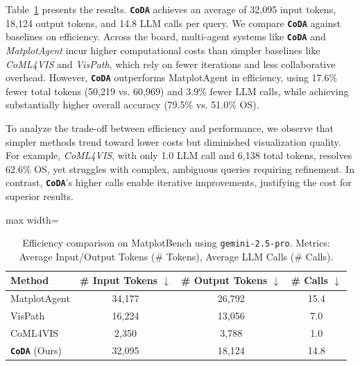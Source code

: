 \documentclass[11pt, a4paper, logo, copyright]{googlecloud}
\newcommand{\methodname}{\textbf{\texttt{\textcolor{StarIndigo}{C}\textcolor{StarIndigo}{o}\textcolor{StarCoral}{D}\textcolor{StarTeal}{A}}}}
\newcommand{\io}[1]{\setlength{\fboxsep}{1pt}\colorbox{gray!10}{\texttt{#1}}}
\begin{document}
Table~\ref{tab:efficiency-comparison} presents the results. \methodname{} achieves an average of 32,095 input tokens, 18,124 output tokens, and 14.8 LLM calls per query.
We compare \methodname{} against baselines on efficiency. Across the board, multi-agent systems like \methodname{} and \textit{MatplotAgent} incur higher computational costs than simpler baselines like \textit{CoML4VIS} and \textit{VisPath}, which rely on fewer iterations and less collaborative overhead. However, \methodname{} outperforms MatplotAgent in efficiency, using 17.6\% fewer total tokens (50,219 vs. 60,969) and 3.9\% fewer LLM calls, while achieving substantially higher overall accuracy (79.5\% vs. 51.0\% OS).

To analyze the trade-off between efficiency and performance, we observe that simpler methods trend toward lower costs but diminished visualization quality. For example, \textit{CoML4VIS}, with only 1.0 LLM call and 6,138 total tokens, resolves 62.6\% OS, yet struggles with complex, ambiguous queries requiring refinement. In contrast, \methodname{}'s higher calls enable iterative improvements, justifying the cost for superior results.



\begin{table}[t]
\caption{Efficiency comparison on MatplotBench using \io{gemini-2.5-pro}. Metrics: Average Input/Output Tokens (\# Tokens), Average LLM Calls (\# Calls).}
\centering
\footnotesize
\setlength{\tabcolsep}{8pt}
\begin{adjustbox}{max width=\linewidth}
\begin{tabular}{lccc}
\toprule
\textbf{Method} & \textbf{\# Input Tokens $\downarrow$} & \textbf{\# Output Tokens $\downarrow$} & \textbf{\# Calls $\downarrow$} \\
\midrule
MatplotAgent       & 34,177 & 26,792 & 15.4 \\
VisPath            & 16,224 & 13,056 & 7.0 \\
CoML4VIS           & 2,350 & 3,788 & 1.0 \\ \midrule
\methodname{} (Ours) & 32,095 & 18,124 & 14.8 \\
\bottomrule
\end{tabular}
\end{adjustbox}
\label{tab:efficiency-comparison}
\end{table}
\end{document}
